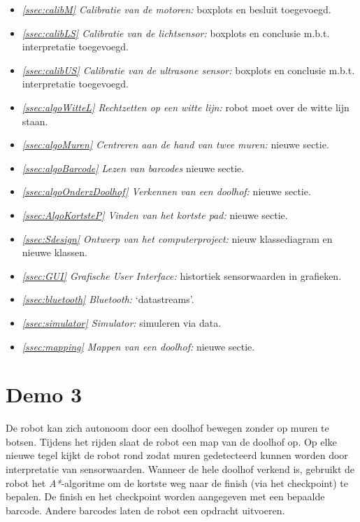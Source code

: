 \documentclass[eind]{penoverslag}
\begin{document}
\begin{itemize}
\item \textit{\ref{ssec:calibM} Calibratie van de motoren:} boxplots en besluit toegevoegd.
\item \textit{\ref{ssec:calibLS} Calibratie van de lichtsensor:} boxplots en conclusie m.b.t. interpretatie toegevoegd.
\item \textit{\ref{ssec:calibUS} Calibratie van de ultrasone sensor:} boxplots en conclusie m.b.t. interpretatie toegevoegd.
\item \textit{\ref{ssec:algoWitteL} Rechtzetten op een witte lijn:} robot moet over de witte lijn staan.
\item \textit{\ref{ssec:algoMuren} Centreren aan de hand van twee muren:} nieuwe sectie.
\item \textit{\ref{ssec:algoBarcode} Lezen van barcodes} nieuwe sectie.
\item \textit{\ref{ssec:algoOnderzDoolhof} Verkennen van een doolhof:} nieuwe sectie.
\item \textit{\ref{ssec:AlgoKortsteP} Vinden van het kortste pad:} nieuwe sectie.
\item \textit{\ref{ssec:Sdesign} Ontwerp van het computerproject:} nieuw klassediagram en nieuwe klassen.
\item \textit{\ref{ssec:GUI} Grafische User Interface:} histortiek sensorwaarden in grafieken.
\item \textit{\ref{ssec:bluetooth} Bluetooth:} `datastreams'.
\item \textit{\ref{ssec:simulator} Simulator:} simuleren via data.
\item \textit{\ref{ssec:mapping} Mappen van een doolhof:} nieuwe sectie.
\end{itemize}


\section{Demo 3} %
\label{Asec:demo3}
De robot kan zich autonoom door een doolhof bewegen zonder op muren te botsen. Tijdens het rijden slaat de robot een map van de doolhof op. Op elke nieuwe tegel kijkt de robot rond zodat muren gedetecteerd kunnen worden door interpretatie van sensorwaarden. Wanneer de hele doolhof verkend is, gebruikt de robot het \textit{A*}-algoritme om de kortste weg naar de finish (via het checkpoint) te bepalen. De finish en het checkpoint worden aangegeven met een bepaalde barcode. Andere barcodes laten de robot een opdracht uitvoeren.
\end{document}
